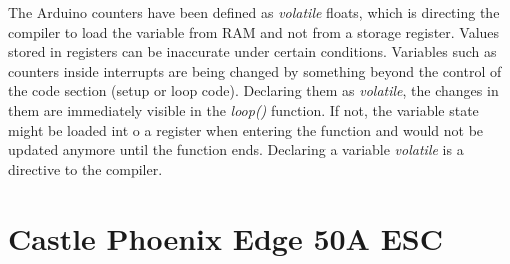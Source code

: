\documentclass[a4paper]{article}
\begin{document}
The Arduino counters have been defined as \textit{volatile}\cite{volatiles} floats, which is directing the compiler to load the variable from RAM and not from a storage register. Values stored in registers can be inaccurate under certain conditions. Variables such as counters inside interrupts are being changed by something beyond the control of the code section (setup or loop code). Declaring them as \textit{volatile}, the changes in them are immediately visible in the \textit{loop()} function. If not, the variable state might be loaded int o a register when entering the function and would not be updated anymore until the function ends. 
Declaring a variable \textit{volatile} is a directive to the compiler.


\section{Castle Phoenix Edge 50A ESC}
\end{document}
